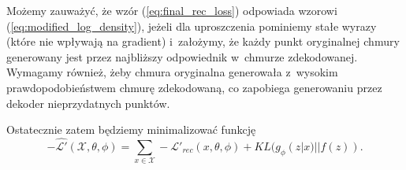 \documentclass{iithesis}
\begin{document}
Możemy zauważyć, że wzór (\ref{eq:final_rec_loss}) odpowiada wzorowi (\ref{eq:modified_log_density}),
jeżeli dla uproszczenia pominiemy stałe wyrazy (które nie wpływają na gradient) i~założymy,
że każdy punkt oryginalnej chmury generowany jest przez najbliższy odpowiednik w~chmurze zdekodowanej.
Wymagamy również, żeby chmura oryginalna generowała z~wysokim prawdopodobieństwem chmurę zdekodowaną,
co zapobiega generowaniu przez dekoder nieprzydatnych punktów.

Ostatecznie zatem będziemy minimalizować funkcję
\begin{equation}
-\hat{\mathcal{L'}}(\mathcal{X},\theta,\phi) = \sum_{x \in \mathcal{X}} -\mathcal{L'}_{rec}(x,\theta,\phi)
+ KL(g_\phi(z|x)||f(z)).
\end{equation}

\end{document}
